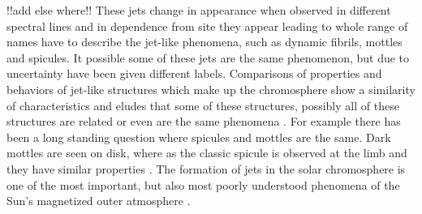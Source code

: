 \documentclass[12pt]{ociamthesis}
\newcommand{\np}{\\ \\}
\begin{document}
{\color{green} !!add else where!! }These jets change in appearance when observed in different spectral lines and in dependence from site they appear leading to whole range of names have to describe the jet-like phenomena, such as dynamic fibrils, mottles and spicules. It possible some of these jets are the same phenomenon, but due to uncertainty have been given different labels. Comparisons of properties and behaviors of jet-like structures which make up the chromosphere show a similarity of characteristics and eludes that some of these structures, possibly all of these structures are related or even are the same phenomena \cite{Porfir2016A}. For example there has been a long standing question where spicules and mottles are the same. Dark mottles are seen on disk, where as the classic spicule is observed at the limb and they have similar properties \cite{Pontieu2007ASPC}. The formation of jets in the solar chromosphere is one of the most important, but also most poorly understood phenomena of the Sun's magnetized outer atmosphere \citep{Hansteen2006ApJ}. \np
\end{document}
